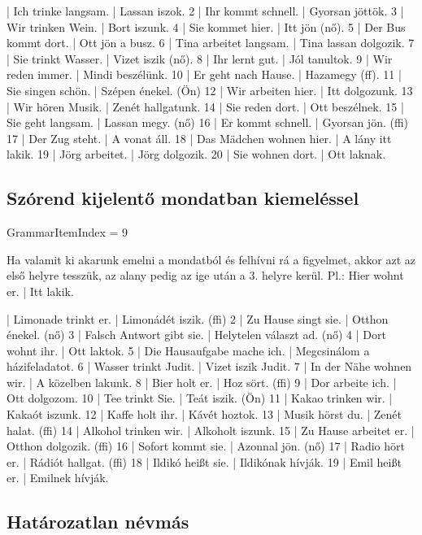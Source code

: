 \documentclass{article}
\newenvironment{desc}{\verbatim}{\endverbatim}
\newenvironment{exmp}{\verbatim}{\endverbatim}
\begin{document}
\begin{exmp}
1 | Ich trinke langsam. | Lassan iszok.
2 | Ihr kommt schnell. | Gyorsan jöttök.
3 | Wir trinken Wein. | Bort iszunk.
4 | Sie kommet hier. | Itt jön (nő).
5 | Der Bus kommt dort. | Ott jön a busz.
6 | Tina arbeitet langsam. | Tina lassan dolgozik.
7 | Sie trinkt Wasser. | Vizet iszik (nő).
8 | Ihr lernt gut. | Jól tanultok.
9 | Wir reden immer. | Mindi beszélünk.
10 | Er geht nach Hause. | Hazamegy (ff).
11 | Sie singen schön. | Szépen énekel. (Ön)
12 | Wir arbeiten hier. | Itt dolgozunk.
13 | Wir hören Musik. | Zenét hallgatunk.
14 | Sie reden dort. | Ott beszélnek.
15 | Sie geht langsam. | Lassan megy. (nő)
16 | Er kommt schnell. | Gyorsan jön. (ffi)
17 | Der Zug steht. | A vonat áll.
18 | Das Mädchen wohnen hier. | A lány itt lakik.
19 | Jörg arbeitet. | Jörg dolgozik.
20 | Sie wohnen dort. | Ott laknak.
\end{exmp}

\subsection{Szórend kijelentő mondatban kiemeléssel}

GrammarItemIndex = 9

\begin{desc}
Ha valamit ki akarunk emelni a mondatból és felhívni rá a figyelmet,
akkor azt az első helyre tesszük, az alany pedig az ige után a 3. helyre kerül.
Pl.: Hier wohnt er. | Itt lakik.
\end{desc}

\begin{exmp}
1 | Limonade trinkt er. | Limonádét iszik. (ffi)
2 | Zu Hause singt sie. | Otthon énekel. (nő)
3 | Falsch Antwort gibt sie. | Helytelen választ ad. (nő)
4 | Dort wohnt ihr. | Ott laktok.
5 | Die Hausaufgabe mache ich. | Megcsinálom a házifeladatot.
6 | Wasser trinkt Judit. | Vizet iszik Judit.
7 | In der Nähe wohnen wir. | A közelben lakunk.
8 | Bier holt er. | Hoz sört. (ffi)
9 | Dor arbeite ich. | Ott dolgozom.
10 | Tee trinkt Sie. | Teát iszik. (Ön)
11 | Kakao trinken wir. | Kakaót iszunk.
12 | Kaffe holt ihr. | Kávét hoztok.
13 | Musik hörst du. | Zenét halat. (ffi)
14 | Alkohol trinken wir. | Alkoholt iszunk.
15 | Zu Hause arbeitet er. | Otthon dolgozik. (ffi)
16 | Sofort kommt sie. | Azonnal jön. (nő)
17 | Radio hört er. | Rádiót hallgat. (ffi)
18 | Ildikó heißt sie. | Ildikónak hívják.
19 | Emil heißt er. | Emilnek hívják.
\end{exmp}

\subsection{Határozatlan névmás}
\end{document}
